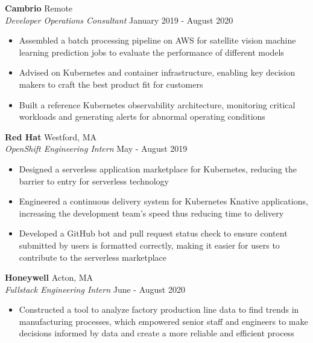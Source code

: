 \documentclass[10pt]{article}
\begin{document}
\begin{flushleft}
	\textbf{Cambrio} \hfill Remote \\
	\textit{Developer Operations Consultant} \hfill January 2019 - August 2020  \\
	\begin{itemize}
		\item Assembled a batch processing pipeline on AWS for satellite vision machine learning prediction jobs to evaluate the performance of different models

		\item Advised on Kubernetes and container infrastructure, enabling key decision makers to craft the best product fit for customers

		\item Built a reference Kubernetes observability architecture, monitoring critical workloads and generating alerts for abnormal operating conditions
	\end{itemize}

	 \textbf{Red Hat} \hfill Westford, MA \\
	 \textit{OpenShift Engineering Intern} \hfill May - August 2019 \\
	 \begin{itemize}
		 \item Designed a serverless application marketplace for Kubernetes, reducing the barrier to entry for serverless technology
		 
		 \item Engineered a continuous delivery system for Kubernetes Knative applications, increasing the development team's speed thus reducing time to delivery
 
		 \item Developed a GitHub bot and pull request status check to ensure content submitted by users is formatted correctly, making it easier for users to contribute to the serverless marketplace
	 \end{itemize}

	\textbf{Honeywell} \hfill Acton, MA \\
	\textit{Fullstack Engineering Intern} \hfill June - August 2020 \\
    \begin{itemize}
        \item Constructed a tool to analyze factory production line data to find trends in manufacturing processes, which empowered senior staff and engineers to make decisions informed by data and create a more reliable and efficient process


\end{itemize}
\end{flushleft}
\end{document}
